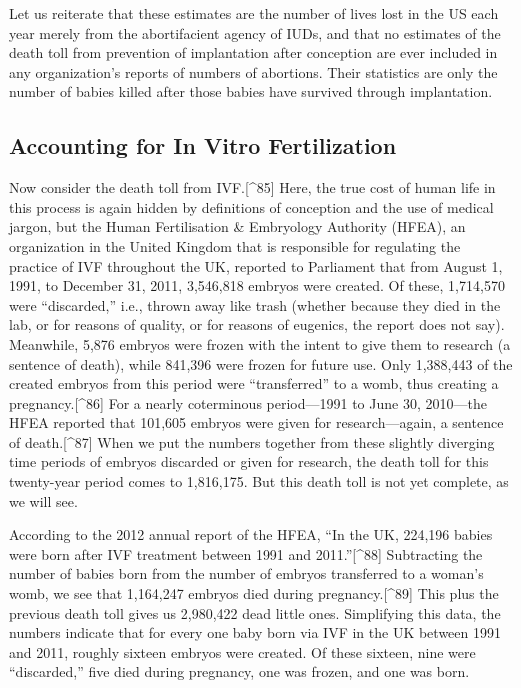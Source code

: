 \documentclass[
]{book}
\begin{document}
Let us reiterate that these estimates are the number of lives lost in the US each year merely from the abortifacient agency of IUDs, and that no estimates of the death toll from prevention of implantation after conception are ever included in any organization's reports of numbers of abortions. Their statistics are only the number of babies killed after those babies have survived through implantation.

\hypertarget{accounting-for-in-vitro-fertilization}{%
\subsection{Accounting for In Vitro Fertilization}\label{accounting-for-in-vitro-fertilization}}

Now consider the death toll from IVF.{[}\^{}85{]} Here, the true cost of human life in this process is again hidden by definitions of conception and the use of medical jargon, but the Human Fertilisation \& Embryology Authority (HFEA), an organization in the United Kingdom that is responsible for regulating the practice of IVF throughout the UK, reported to Parliament that from August 1, 1991, to December 31, 2011, 3,546,818 embryos were created. Of these, 1,714,570 were ``discarded,'' i.e., thrown away like trash (whether because they died in the lab, or for reasons of quality, or for reasons of eugenics, the report does not say). Meanwhile, 5,876 embryos were frozen with the intent to give them to research (a sentence of death), while 841,396 were frozen for future use. Only 1,388,443 of the created embryos from this period were ``transferred'' to a womb, thus creating a pregnancy.{[}\^{}86{]} For a nearly coterminous period---1991 to June 30, 2010---the HFEA reported that 101,605 embryos were given for research---again, a sentence of death.{[}\^{}87{]} When we put the numbers together from these slightly diverging time periods of embryos discarded or given for research, the death toll for this twenty-year period comes to 1,816,175. But this death toll is not yet complete, as we will see.

According to the 2012 annual report of the HFEA, ``In the UK, 224,196 babies were born after IVF treatment between 1991 and 2011.''{[}\^{}88{]} Subtracting the number of babies born from the number of embryos transferred to a woman's womb, we see that 1,164,247 embryos died during pregnancy.{[}\^{}89{]} This plus the previous death toll gives us 2,980,422 dead little ones. Simplifying this data, the numbers indicate that for every one baby born via IVF in the UK between 1991 and 2011, roughly sixteen embryos were created. Of these sixteen, nine were ``discarded,'' five died during pregnancy, one was frozen, and one was born.
\end{document}
